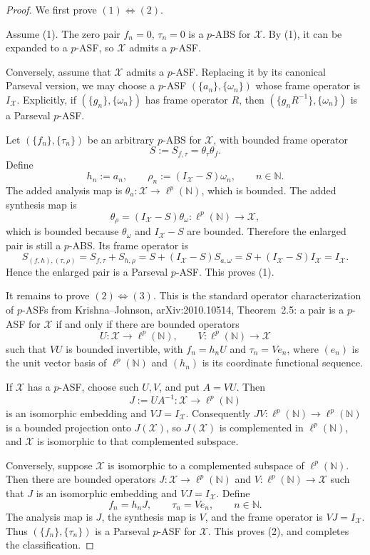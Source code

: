 \documentclass[11pt]{article}
\newcommand{\lp}{\ell^p(\mathbb N)}
\newcommand{\X}{\mathcal X}
\begin{document}
\begin{proof}
We first prove \((1)\Leftrightarrow(2)\).

Assume (1).  The zero pair \(f_n=0\), \(\tau_n=0\) is a \(p\)-ABS for \(\X\).  By (1), it can be expanded to a \(p\)-ASF, so \(\X\) admits a \(p\)-ASF.

Conversely, assume that \(\X\) admits a \(p\)-ASF.  Replacing it by its canonical Parseval version, we may choose a \(p\)-ASF \((\{a_n\},\{\omega_n\})\) whose frame operator is \(I_\X\).  Explicitly, if \((\{g_n\},\{\omega_n\})\) has frame operator \(R\), then \((\{g_nR^{-1}\},\{\omega_n\})\) is a Parseval \(p\)-ASF.

Let \((\{f_n\},\{\tau_n\})\) be an arbitrary \(p\)-ABS for \(\X\), with bounded frame operator
\[
S:=S_{f,\tau}=\theta_\tau\theta_f.
\]
Define
\[
 h_n:=a_n,\qquad \rho_n:=(I_\X-S)\omega_n,\qquad n\in\mathbb N.
\]
The added analysis map is \(\theta_a:\X\to\lp\), which is bounded.  The added synthesis map is
\[
\theta_\rho=(I_\X-S)\theta_\omega:\lp\to\X,
\]
which is bounded because \(\theta_\omega\) and \(I_\X-S\) are bounded.  Therefore the enlarged pair is still a \(p\)-ABS.  Its frame operator is
\[
S_{(f,h),(\tau,\rho)}
=S_{f,\tau}+S_{h,\rho}
=S+(I_\X-S)S_{a,\omega}
=S+(I_\X-S)I_\X
=I_\X.
\]
Hence the enlarged pair is a Parseval \(p\)-ASF.  This proves (1).

It remains to prove \((2)\Leftrightarrow(3)\).  This is the standard operator characterization of \(p\)-ASFs from Krishna--Johnson, arXiv:2010.10514, Theorem~2.5: a pair is a \(p\)-ASF for \(\X\) if and only if there are bounded operators
\[
 U:\X\to\lp,\qquad V:\lp\to\X
\]
such that \(VU\) is bounded invertible, with \(f_n=h_nU\) and \(\tau_n=Ve_n\), where \((e_n)\) is the unit vector basis of \(\lp\) and \((h_n)\) is its coordinate functional sequence.

If \(\X\) has a \(p\)-ASF, choose such \(U,V\), and put \(A=VU\).  Then
\[
J:=UA^{-1}:\X\to\lp
\]
is an isomorphic embedding and \(VJ=I_\X\).  Consequently \(JV:\lp\to\lp\) is a bounded projection onto \(J(\X)\), so \(J(\X)\) is complemented in \(\lp\), and \(\X\) is isomorphic to that complemented subspace.

Conversely, suppose \(\X\) is isomorphic to a complemented subspace of \(\lp\).  Then there are bounded operators \(J:\X\to\lp\) and \(V:\lp\to\X\) such that \(J\) is an isomorphic embedding and \(VJ=I_\X\).  Define
\[
 f_n=h_nJ,\qquad \tau_n=Ve_n,\qquad n\in\mathbb N.
\]
The analysis map is \(J\), the synthesis map is \(V\), and the frame operator is \(VJ=I_\X\).  Thus \((\{f_n\},\{\tau_n\})\) is a Parseval \(p\)-ASF for \(\X\).  This proves (2), and completes the classification.
\end{proof}
\end{document}
